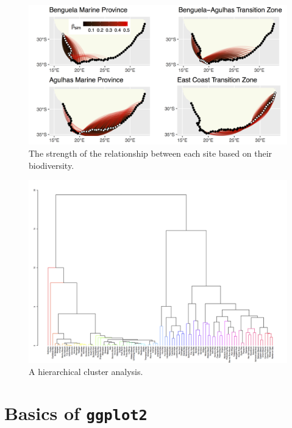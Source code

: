 \documentclass[]{book}
\theoremstyle{definition}
\theoremstyle{definition}
\theoremstyle{definition}
\theoremstyle{remark}
\begin{document}
\begin{figure}

{\centering \includegraphics[width=1\linewidth]{figures/PLOS_ONE_Fig4} 

}

\caption{The strength of the relationship between each site based on their biodiversity.}\label{fig:example19}
\end{figure}

\begin{figure}

{\centering \includegraphics[width=1\linewidth]{figures/hierarchical_clustsig} 

}

\caption{A hierarchical cluster analysis.}\label{fig:example15}
\end{figure}

\section{\texorpdfstring{Basics of
\textbf{\texttt{ggplot2}}}{Basics of ggplot2}}\label{basics-of-ggplot2}
\end{document}
